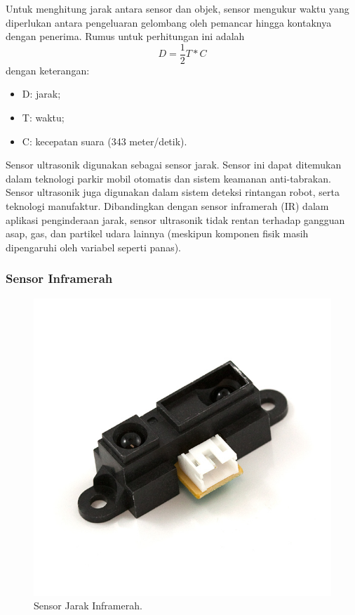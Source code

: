         Untuk menghitung jarak antara sensor dan objek, sensor mengukur waktu yang diperlukan antara pengeluaran gelombang oleh pemancar hingga kontaknya dengan penerima. Rumus untuk perhitungan ini adalah \[D = \frac{1}{2}T * C\] 
        \newline \noindent dengan keterangan:
        \begin{itemize}
            \item D: jarak;
            \item T: waktu;
            \item C: kecepatan suara (343 meter/detik).
        \end{itemize}
        
        Sensor ultrasonik digunakan sebagai sensor jarak. Sensor ini dapat ditemukan dalam teknologi parkir mobil otomatis dan sistem keamanan anti-tabrakan. Sensor ultrasonik juga digunakan dalam sistem deteksi rintangan robot, serta teknologi manufaktur. Dibandingkan dengan sensor inframerah (IR) dalam aplikasi penginderaan jarak, sensor ultrasonik tidak rentan terhadap gangguan asap, gas, dan partikel udara lainnya (meskipun komponen fisik masih dipengaruhi oleh variabel seperti panas).
        
        \subsubsection{Sensor Inframerah}
        \label{subsec:Infrared}
        
        \begin{figure}[H]
            \centering
            \includegraphics[scale=0.3]{infrared_sensor.jpg}
            \caption{Sensor Jarak Inframerah\cite{b_g2}.}
            \label{fig:Ch02_inframerah}
        \end{figure}
        

